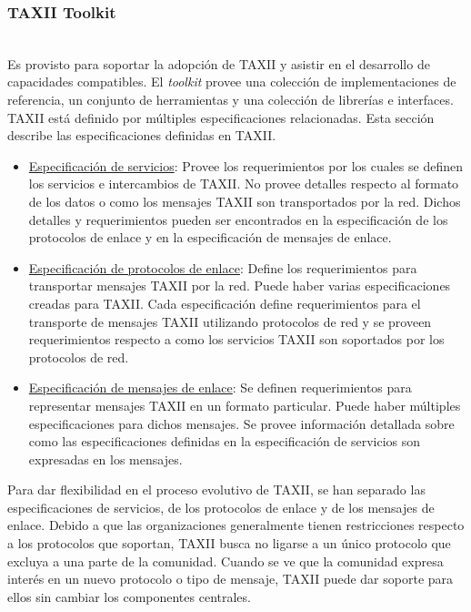 \subsubsection{TAXII Toolkit}\ \\

Es provisto para soportar la adopción de TAXII y asistir en el desarrollo de 
capacidades compatibles. El \textit{toolkit} provee una colección de implementaciones de 
referencia, un conjunto de herramientas y una colección de librerías e 
interfaces.\\

TAXII está definido por múltiples especificaciones relacionadas. Esta sección 
describe las especificaciones definidas en TAXII.

\begin{itemize}
  \item \underline{Especificación de servicios}: Provee los requerimientos por los cuales se 
  definen los servicios e intercambios de TAXII. No provee detalles respecto al 
  formato de los datos o como los mensajes TAXII son transportados por la red. 
  Dichos detalles y requerimientos pueden ser encontrados en la especificación 
  de los protocolos de enlace y en la especificación de mensajes de enlace.
 \item \underline{Especificación de protocolos de enlace}: Define los requerimientos para 
 transportar mensajes TAXII por la red. Puede haber varias especificaciones 
 creadas para TAXII. Cada especificación define requerimientos para el 
 transporte de mensajes TAXII utilizando protocolos de red y se proveen 
 requerimientos respecto a como los servicios TAXII son soportados por los 
 protocolos de red.
 \item \underline{Especificación de mensajes de enlace}: Se definen requerimientos para 
 representar mensajes TAXII en un formato particular. Puede haber múltiples 
 especificaciones para dichos mensajes. Se provee información detallada sobre 
 como las especificaciones definidas en la especificación de servicios son 
 expresadas en los mensajes.
\end{itemize}

Para dar flexibilidad en el proceso evolutivo de TAXII, se han separado las 
especificaciones de servicios, de los protocolos de enlace y de los mensajes de 
enlace.
Debido a que las organizaciones generalmente tienen restricciones 
respecto a los protocolos que soportan, TAXII busca no ligarse a un único 
protocolo que excluya a una parte de la comunidad. Cuando se ve que la comunidad 
expresa interés en un nuevo protocolo o tipo de mensaje, TAXII puede dar soporte 
para ellos sin cambiar los componentes centrales.\\

